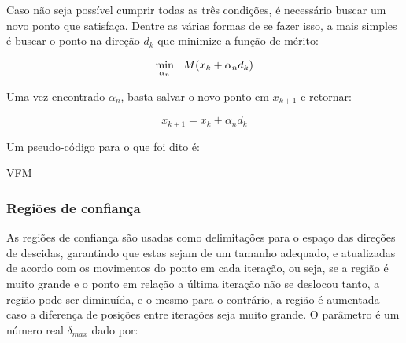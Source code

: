 Caso não seja possível cumprir todas as três condições, é necessário buscar um novo ponto
que satisfaça. Dentre as várias formas de se fazer isso, a mais simples é buscar o ponto
na direção \(d_k\) que minimize a função de mérito:

\begin{equation}
\underset{\alpha_n}{\mathrm{min}} \hspace{0.3cm} M(x_k + \alpha_n d_k)
\end{equation}

Uma vez encontrado \(\alpha_n\), basta salvar o novo ponto em \(x_{k+1}\) e retornar:

\begin{equation}
  x_{k+1} = x_k + \alpha_n d_k
\end{equation}

Um pseudo-código para o que foi dito é:

\vspace{15pt}
\begin{algorithm}[H]
  \SetAlgoLined
  \caption{VFM}
\end{algorithm}
\vspace{15pt}



\subsubsection{Regiões de confiança}

\noindent
As regiões de confiança são usadas como delimitações para o espaço das direções de descidas,
garantindo que estas sejam de um tamanho adequado, e atualizadas de acordo com os movimentos do
ponto em cada iteração, ou seja, se a região é muito grande e o ponto em relação a última
iteração não se deslocou tanto, a região pode ser diminuída, e o mesmo para o contrário,
a região é aumentada caso a diferença de posições entre iterações seja muito grande. O
parâmetro é um número real \(\delta_{max}\) dado por:

